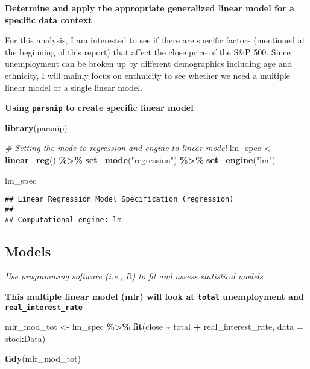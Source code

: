 \documentclass[
]{article}
\newenvironment{Shaded}{\begin{snugshade}}{\end{snugshade}}
\newcommand{\AttributeTok}[1]{\textcolor[rgb]{0.13,0.29,0.53}{#1}}
\newcommand{\CommentTok}[1]{\textcolor[rgb]{0.56,0.35,0.01}{\textit{#1}}}
\newcommand{\FunctionTok}[1]{\textcolor[rgb]{0.13,0.29,0.53}{\textbf{#1}}}
\newcommand{\NormalTok}[1]{#1}
\newcommand{\OtherTok}[1]{\textcolor[rgb]{0.56,0.35,0.01}{#1}}
\newcommand{\SpecialCharTok}[1]{\textcolor[rgb]{0.81,0.36,0.00}{\textbf{#1}}}
\newcommand{\StringTok}[1]{\textcolor[rgb]{0.31,0.60,0.02}{#1}}
\begin{document}
\textbf{Determine and apply the appropriate generalized linear model for
a specific data context}

For this analysis, I am interested to see if there are specific factors
(mentioned at the beginning of this report) that affect the close price
of the S\&P 500. Since unemployment can be broken up by different
demographics including age and ethnicity, I will mainly focus on
enthnicity to see whether we need a multiple linear model or a single
linear model.

\textbf{Using \texttt{parsnip} to create specific linear model}

\begin{Shaded}
\begin{Highlighting}[]
\FunctionTok{library}\NormalTok{(parsnip)}

\CommentTok{\# Setting the mode to regression and engine to linear model}
\NormalTok{lm\_spec }\OtherTok{\textless{}{-}} \FunctionTok{linear\_reg}\NormalTok{() }\SpecialCharTok{\%\textgreater{}\%}
  \FunctionTok{set\_mode}\NormalTok{(}\StringTok{"regression"}\NormalTok{) }\SpecialCharTok{\%\textgreater{}\%}
  \FunctionTok{set\_engine}\NormalTok{(}\StringTok{"lm"}\NormalTok{)}

\NormalTok{lm\_spec}
\end{Highlighting}
\end{Shaded}

\begin{verbatim}
## Linear Regression Model Specification (regression)
## 
## Computational engine: lm
\end{verbatim}

\hypertarget{models}{%
\subsection{Models}\label{models}}

\emph{Use programming software (i.e., R) to fit and assess statistical
models}

\textbf{This multiple linear model (mlr) will look at \texttt{total}
unemployment and \texttt{real\_interest\_rate}}

\begin{Shaded}
\begin{Highlighting}[]
\NormalTok{mlr\_mod\_tot }\OtherTok{\textless{}{-}}\NormalTok{ lm\_spec }\SpecialCharTok{\%\textgreater{}\%} 
  \FunctionTok{fit}\NormalTok{(close }\SpecialCharTok{\textasciitilde{}}\NormalTok{ total }\SpecialCharTok{+}\NormalTok{ real\_interest\_rate, }\AttributeTok{data =}\NormalTok{ stockData)}

\FunctionTok{tidy}\NormalTok{(mlr\_mod\_tot)}
\end{Highlighting}
\end{Shaded}
\end{document}
